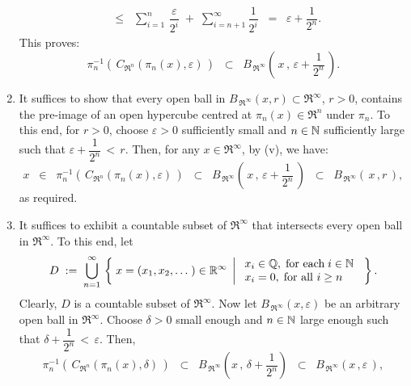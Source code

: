 \begin{enumerate}
\begin{eqnarray*}
		\;\;\leq\;\; \sum^{n}_{i=1}\,\dfrac{\varepsilon}{2^{i}} \;+\; \sum^{\infty}_{i=n+1}\dfrac{1}{2^{i}}
		\;\;=\;\; \varepsilon + \dfrac{1}{2^{n}}.
	\end{eqnarray*}
	This proves:
	\begin{equation*}
	\pi_{n}^{-1}\!\left(\,C_{\Re^{n}}(\pi_{n}(x),\varepsilon)\,\right)
	\;\;\subset\;\; B_{\mbox{}\,\Re^{\infty}}\!\left(\,x\,,\,\varepsilon + \dfrac{1}{2^{n}}\,\right).
	\end{equation*}
\item
	It suffices to show that every open ball in
	$B_{\mbox{}\,\Re^{\infty}}\!\left(x,r\right) \subset \Re^{\infty}$, $r > 0$,
	contains the pre-image of an open hypercube centred at $\pi_{n}(x) \in \Re^{n}$
	under $\pi_{n}$.
	To this end, for $r > 0$,
	choose $\varepsilon > 0$ sufficiently small and $n \in \mathbb{N}$ sufficiently large
	such that $\varepsilon + \dfrac{1}{2^{n}} \, < \, r$.
	Then, for any $x \in \Re^{\infty}$, by (v), we have:
	\begin{equation*}
	x
	\;\;\in\;\; \pi_{n}^{-1}\!\left(\,C_{\Re^{n}}(\pi_{n}(x),\varepsilon)\,\right)
	\;\;\subset\;\; B_{\mbox{}\,\Re^{\infty}}\!\left(\,x\,,\,\varepsilon + \dfrac{1}{2^{n}}\,\right)
	\;\;\subset\;\; B_{\mbox{}\,\Re^{\infty}}\!\left(\,x\,,r\,\right),
	\end{equation*}
	as required.
\item
	It suffices to exhibit a countable subset of $\Re^{\infty}$ that intersects every open ball in $\Re^{\infty}$.
	To this end, let
	\begin{equation*}
	D \; := \;
	\bigcup_{n=1}^{\infty}\,
	\left\{\;
	x = (x_{1},x_{2},\ldots\;) \in \mathbb{R}^{\infty}
	\;\left\vert\;
	\begin{array}{l}
	x_{i} \in \mathbb{Q},\;\textnormal{for each}\;i \in \mathbb{N}
	\\
	x_{i} = 0,\;\textnormal{for all $i \geq n$}
	\end{array}
	\right.
	\;\right\}.
	\end{equation*}
	Clearly, $D$ is a countable subset of $\Re^{\infty}$.
	Now let $B_{\mbox{}\,\Re^{\infty}}\!\left(x,\varepsilon\right)$ be an arbitrary open ball in $\Re^{\infty}$.
	Choose $\delta > 0$ small enough and $n \in \mathbb{N}$ large enough such that
	$\delta + \dfrac{1}{2^{n}} \, < \, \varepsilon$.
	Then,	
	\begin{equation*}
	\pi_{n}^{-1}\!\left(\,C_{\Re^{n}}(\pi_{n}(x),\delta)\,\right)
	\;\;\subset\;\;
	B_{\mbox{}\,\Re^{\infty}}\!\left(x\,,\,\delta + \frac{1}{2^{n}}\right)
	\;\;\subset\;\;
	B_{\mbox{}\,\Re^{\infty}}\!\left(x\,,\varepsilon\,\right),

\end{equation*}
\end{enumerate}
